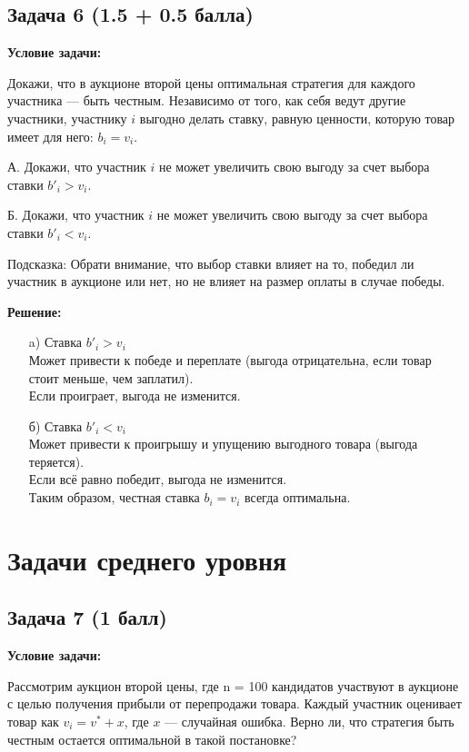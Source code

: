 \documentclass[a4paper,12pt]{article}
\begin{document}
\subsection{Задача 6 (1.5 + 0.5 балла)}
\textbf{Условие задачи:}

Докажи, что в аукционе второй цены оптимальная стратегия для каждого участника — быть честным. Независимо от того, как себя ведут другие участники, участнику $i$ выгодно делать ставку, равную ценности, которую товар имеет для него: $b_i = v_i$.

А. Докажи, что участник $i$ не может увеличить свою выгоду за счет выбора ставки $b'_i > v_i$.

Б. Докажи, что участник $i$ не может увеличить свою выгоду за счет выбора ставки $b'_i < v_i$.

Подсказка: Обрати внимание, что выбор ставки влияет на то, победил ли участник в аукционе или нет, но не влияет на размер оплаты в случае победы.

\textbf{Решение:}

\begin{itemize}
    \item [a)] Ставка \(b'_i > v_i\)\\
    Может привести к победе и переплате (выгода отрицательна, если товар стоит меньше, чем заплатил).\\
    Если проиграет, выгода не изменится.

    \item [б)] Ставка \(b'_i < v_i\)\\  
    Может привести к проигрышу и упущению выгодного товара (выгода теряется).\\
    Если всё равно победит, выгода не изменится.\\
    Таким образом, честная ставка \(b_i = v_i\) всегда оптимальна.
\end{itemize}

\vspace{1cm}

\section{Задачи среднего уровня}

\subsection{Задача 7 (1 балл)}
\textbf{Условие задачи:}

Рассмотрим аукцион второй цены, где n = 100 кандидатов участвуют в аукционе с целью получения прибыли от перепродажи товара. Каждый участник оценивает товар как $v_i = v^* + x$, где $x$ — случайная ошибка. Верно ли, что стратегия быть честным остается оптимальной в такой постановке?
\end{document}
